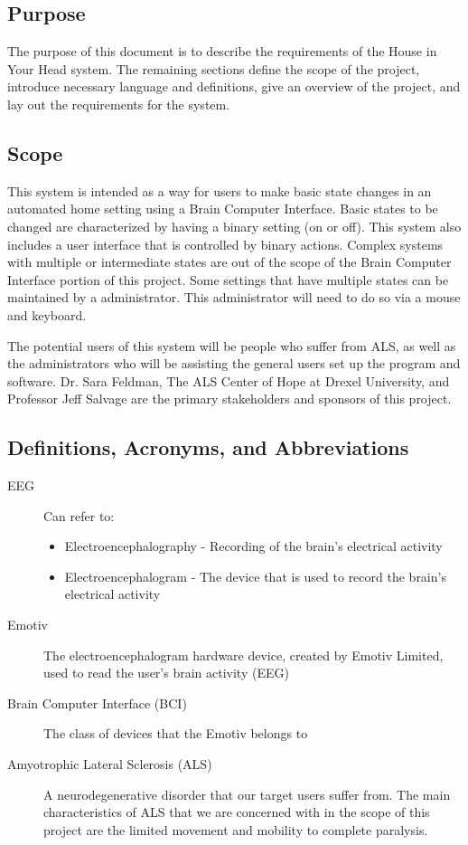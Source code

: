 \documentclass{article}
\begin{document}
\subsection{Purpose}

The purpose of this document is to describe the requirements of the House in
Your Head system. The remaining sections define the scope of the project,
introduce necessary language and definitions, give an overview of the project,
and lay out the requirements for the system.

\subsection{Scope}

This system is intended as a way for users to make basic state changes in an
automated home setting using a Brain Computer Interface. Basic states to be
changed are characterized by having a binary setting (on or off). This system
also includes a user interface that is controlled by binary actions. Complex
systems with multiple or intermediate states are out of the scope of the Brain
Computer Interface portion of this project. Some settings that have multiple
states can be maintained by a administrator. This administrator will need to
do so via a mouse and keyboard. 

The potential users of this system will be people who suffer from ALS, as well
as the administrators who will be assisting the general users set up the
program and software. Dr. Sara Feldman, The ALS Center of Hope at Drexel
University, and Professor Jeff Salvage are the primary stakeholders and
sponsors of this project.

\subsection{Definitions, Acronyms, and Abbreviations}

\begin{description}
    \item[EEG] Can refer to:
        \begin{itemize}
            \item Electroencephalography - Recording of the brain's electrical
                activity 
	        \item Electroencephalogram - The device that is used to record the
	            brain's electrical activity
        \end{itemize}
    \item[Emotiv] The electroencephalogram hardware device, created by Emotiv
        Limited, used to read the user's brain activity (EEG)
    \item[Brain Computer Interface (BCI)] The class of devices that the Emotiv
        belongs to
    \item[Amyotrophic Lateral Sclerosis (ALS)] A neurodegenerative disorder
        that our target users suffer from. The main characteristics of ALS
        that we are concerned with in the scope of this project are the
        limited movement and mobility to complete paralysis.
\end{description}
\end{document}
